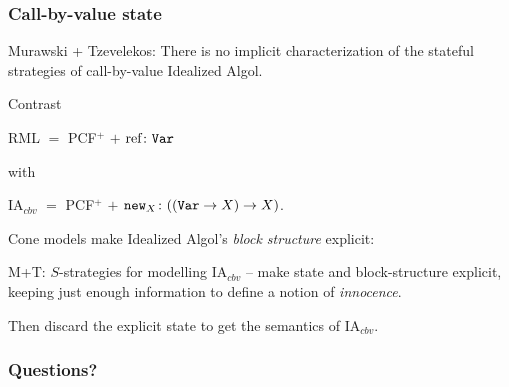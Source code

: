 \documentclass{beamer}
\begin{document}
\begin{frame}
  \frametitle{Call-by-value state}

  Murawski + Tzevelekos: There is no implicit characterization of the stateful strategies of call-by-value Idealized Algol.
  \pause

  Contrast
  
  RML $=$ PCF${}^+$ $+$ $\text{ref}\colon{\mathtt{Var}}$
  
  with
  
  IA${}_{cbv}$ $=$ PCF${}^+$ $+$ ${\mathtt{new}}_X\colon (({\mathtt{Var}} \to X) \to X)$.
  \pause

  Cone models make Idealized Algol's \emph{block structure} explicit:
  \pause
  M+T: $S$-strategies for modelling IA${}_{cbv}$ -- make state and block-structure explicit, keeping just enough information to define a notion of \emph{innocence}.
  \pause

  Then discard the explicit state to get the semantics of IA${}_{cbv}$.
\end{frame}

\begin{frame}
  \frametitle{Questions?}
\end{frame}
\end{document}
